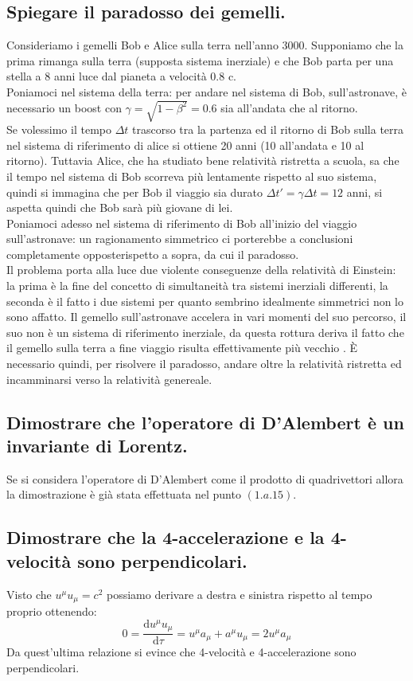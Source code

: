 \subsection[$\ $ Paradosso dei gemelli]{Spiegare il paradosso dei gemelli.} 
Consideriamo i gemelli Bob e Alice sulla terra nell'anno 3000. Supponiamo che la prima rimanga sulla terra (supposta sistema inerziale) e che Bob parta per una stella a 8 anni luce dal pianeta a velocità 0.8 c. \\
Poniamoci nel sistema della terra: per andare nel sistema di Bob, sull'astronave, è necessario un boost con $\gamma = \sqrt{1-\beta^2} = 0.6$ sia all'andata che al ritorno.\\
Se volessimo il tempo $\Delta t$ trascorso tra la partenza ed il ritorno di Bob sulla terra nel sistema di riferimento di alice si ottiene 20 anni (10 all'andata e 10 al ritorno). Tuttavia Alice, che ha studiato bene relatività ristretta a scuola, sa che il tempo nel sistema di Bob scorreva più lentamente rispetto al suo sistema, quindi si immagina che per Bob il viaggio sia durato $\Delta t' = \gamma \Delta t = 12$ anni, si aspetta quindi che Bob sarà più giovane di lei.\\
Poniamoci adesso nel sistema di riferimento di Bob all'inizio del viaggio sull'astronave: un ragionamento simmetrico ci porterebbe a conclusioni completamente opposterispetto a sopra, da cui il paradosso. \\
Il problema porta alla luce due violente conseguenze della relatività di Einstein: la prima è la fine del concetto di simultaneità tra sistemi inerziali differenti, la seconda è il fatto i due sistemi per quanto sembrino idealmente simmetrici non lo sono affatto. Il gemello sull'astronave accelera in vari momenti del suo percorso, il suo non è un sistema di riferimento inerziale, da questa rottura deriva il fatto che il gemello sulla terra a fine viaggio risulta effettivamente più vecchio . È necessario quindi, per risolvere il paradosso, andare oltre la relatività ristretta ed incamminarsi verso la relatività genereale. 

\subsection[$\ $ Operatore di D'Alembert invariante di Lorentz]{Dimostrare che l'operatore di D'Alembert è un invariante di Lorentz.} 
Se si considera l'operatore di D'Alembert come il prodotto di quadrivettori allora la dimostrazione è già stata effettuata nel punto $(1.a.15)$.
\subsection[$\ $ 4-accelerazione e 4-velocità perpendicolari.]{Dimostrare che la 4-accelerazione e la 4-velocità sono perpendicolari.} 
Visto che $u^{\mu}u_{\mu} = c^{2}$ possiamo derivare a destra e sinistra rispetto al tempo proprio ottenendo:
\[
	0 = \frac{\mbox{d} u^{\mu}u_{\mu}}{\mbox{d} \tau} = u^{\mu}a_{\mu} + a^{\mu}u_{\mu} = 2 u^{\mu}a_{\mu}
\] 
Da quest'ultima relazione si evince che 4-velocità e 4-accelerazione sono perpendicolari.
